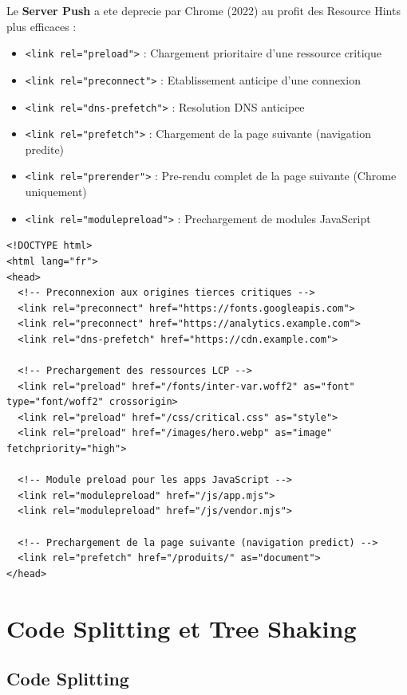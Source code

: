 \documentclass[12pt,a4paper,twoside]{report}
\newcommand{\keyword}[1]{\textbf{\textcolor{googleblue}{#1}}}
\begin{document}
Le \keyword{Server Push} a ete deprecie par Chrome (2022) au profit des Resource Hints plus efficaces :

\begin{itemize}
    \item \texttt{<link rel="preload">} : Chargement prioritaire d'une ressource critique
    \item \texttt{<link rel="preconnect">} : Etablissement anticipe d'une connexion
    \item \texttt{<link rel="dns-prefetch">} : Resolution DNS anticipee
    \item \texttt{<link rel="prefetch">} : Chargement de la page suivante (navigation predite)
    \item \texttt{<link rel="prerender">} : Pre-rendu complet de la page suivante (Chrome uniquement)
    \item \texttt{<link rel="modulepreload">} : Prechargement de modules JavaScript
\end{itemize}

\begin{lstlisting}[style=htmlcode,caption={Resource Hints stratégiques pour une page optimisée}]
<!DOCTYPE html>
<html lang="fr">
<head>
  <!-- Preconnexion aux origines tierces critiques -->
  <link rel="preconnect" href="https://fonts.googleapis.com">
  <link rel="preconnect" href="https://analytics.example.com">
  <link rel="dns-prefetch" href="https://cdn.example.com">

  <!-- Prechargement des ressources LCP -->
  <link rel="preload" href="/fonts/inter-var.woff2" as="font" type="font/woff2" crossorigin>
  <link rel="preload" href="/css/critical.css" as="style">
  <link rel="preload" href="/images/hero.webp" as="image" fetchpriority="high">

  <!-- Module preload pour les apps JavaScript -->
  <link rel="modulepreload" href="/js/app.mjs">
  <link rel="modulepreload" href="/js/vendor.mjs">

  <!-- Prechargement de la page suivante (navigation predict) -->
  <link rel="prefetch" href="/produits/" as="document">
</head>
\end{lstlisting}

\section{Code Splitting et Tree Shaking}

\subsection{Code Splitting}
\end{document}
